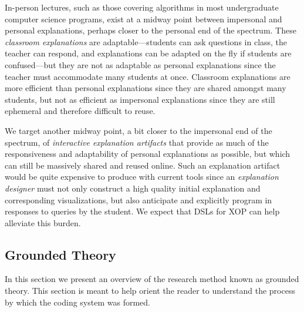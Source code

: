 \documentclass[sigconf]{acmart}
\begin{document}
In-person lectures, such as those covering algorithms in most undergraduate
computer science programs, exist at a midway point between impersonal and
personal explanations, perhaps closer to the personal end of the spectrum.
These \emph{classroom explanations} are adaptable---students can ask questions
in class, the teacher can respond, and explanations can be adapted on the fly
if students are confused---but they are not as adaptable as personal
explanations since the teacher must accommodate many students at once.
Classroom explanations are more efficient than personal explanations since they
are shared amongst many students, but not as efficient as impersonal
explanations since they are still ephemeral and therefore difficult to reuse.


We target another midway point, a bit closer to the impersonal end of the
spectrum, of \emph{interactive explanation artifacts} that provide as much of
the responsiveness and adaptability of personal explanations as possible, but
which can still be massively shared and reused online. Such an explanation
artifact would be quite expensive to produce with current tools since an
\emph{explanation designer} must not only construct a high quality initial
explanation and corresponding visualizations, but also anticipate and
explicitly program in responses to queries by the student.
%
We expect that DSLs for XOP can help alleviate this burden.





\subsection{Grounded Theory}
\label{sec:back:gt}
In this section we present an overview of the research method known as grounded
theory. This section is meant to help orient the reader to understand the
process by which the coding system was formed.
\end{document}
